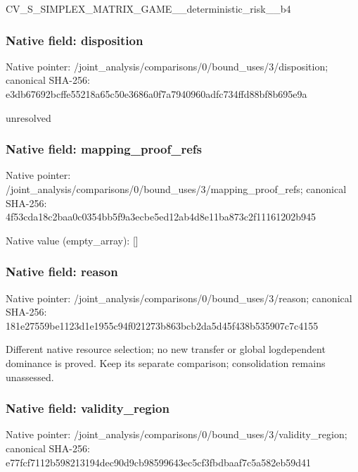 \documentclass[10pt,a4paper]{article}
\begin{document}
CV\_S\_SIMPLEX\_MATRIX\_GAME\allowbreak{}\_\_deterministic\_risk\_\_b4


\subsubsection{Native field: disposition}


Native pointer: /joint\_analysis/comparis\allowbreak{}ons/0/bound\_uses/3/dispo\allowbreak{}sition; canonical SHA-256: e3db67692bcffe55218a65c5\allowbreak{}0e3686a0f7a7940960adfc73\allowbreak{}4ffd88bf8b695e9a


unresolved


\subsubsection{Native field: mapping\_proof\_refs}


Native pointer: /joint\_analysis/comparis\allowbreak{}ons/0/bound\_uses/3/mappi\allowbreak{}ng\_proof\_refs; canonical SHA-256: 4f53cda18c2baa0c0354bb5f\allowbreak{}9a3ecbe5ed12ab4d8e11ba87\allowbreak{}3c2f11161202b945



Native value (empty\_array): []



\subsubsection{Native field: reason}


Native pointer: /joint\_analysis/comparis\allowbreak{}ons/0/bound\_uses/3/reaso\allowbreak{}n; canonical SHA-256: 181e27559be1123d1e1955c9\allowbreak{}4f021273b863bcb2da5d45f4\allowbreak{}38b535907c7c4155


Different native resource selection; no new transfer or global logdependent dominance is proved. Keep its separate comparison; consolidation remains unassessed.


\subsubsection{Native field: validity\_region}


Native pointer: /joint\_analysis/comparis\allowbreak{}ons/0/bound\_uses/3/valid\allowbreak{}ity\_region; canonical SHA-256: e77fcf7112b598213194dec9\allowbreak{}0d9cb98599643ec5cf3fbdba\allowbreak{}af7c5a582eb59d41
\end{document}

